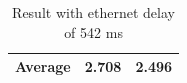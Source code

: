 \begin{table}[h!]
{\begin{tabular}{|c|c|c|}
\multicolumn{1}{|l|}{\textbf{Average}} & \textbf{2.708}                                                                                                                                      & \textbf{2.496}                                                                                                                                  \\ \hline
\end{tabular}
}
\caption{Result with ethernet delay of 542 ms}
\end{table}
